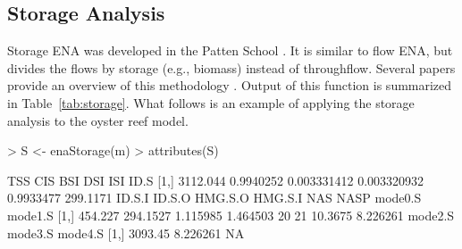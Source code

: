 \documentclass[article]{jss}
\begin{document}
\subsection{Storage Analysis}

Storage ENA was developed in the Patten School
\citep{barber1978retrospective, barber1978markovian}.  It is similar
to flow ENA, but divides the flows by storage (e.g., biomass) instead
of throughflow.  Several papers provide an overview of this
methodology \cite{fath99_review, gattie06, schramski11}.  Output of
this function is summarized in Table~\ref{tab:storage}. What follows
is an example of applying the storage analysis to the oyster reef
model.

\begin{Schunk}
\begin{Sinput}
> S <- enaStorage(m)
> attributes(S)
\end{Sinput}
\begin{Soutput}
          TSS       CIS         BSI         DSI       ISI     ID.S
[1,] 3112.044 0.9940252 0.003331412 0.003320932 0.9933477 299.1171
      ID.S.I   ID.S.O  HMG.S.O  HMG.S.I NAS NASP mode0.S  mode1.S
[1,] 454.227 294.1527 1.115985 1.464503  20   21 10.3675 8.226261
     mode2.S  mode3.S mode4.S
[1,] 3093.45 8.226261      NA
\end{Soutput}
\end{Schunk}
\end{document}
